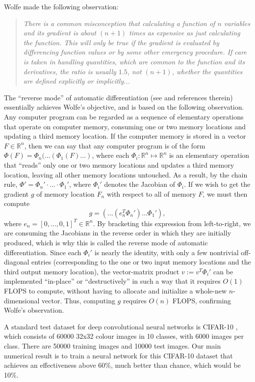 \documentclass[titlepage]{article}
\theoremstyle{plain}
\theoremstyle{definition}
\begin{document}
		
		Wolfe \cite{Wolfe} made the following observation: 
		\begin{quote}
			\textit{There is a common misconception that calculating a function of $n$ variables and its gradient is about $(n + 1)$ times as expensive as just calculating the function. This will only be true if the gradient is evaluated by differencing function values or by some other emergency procedure. If care is taken in handling quantities, which are common to the function and its derivatives, the ratio is usually $1.5$, not $(n + 1)$, whether the quantities are defined explicitly or implicitly...}
		\end{quote}
		The ``reverse mode'' of automatic differentiation (see \cite{Griewank} and references therein) essentially achieves Wolfe's objective, and is based on the following observation. Any computer program can be regarded as a sequence of elementary operations that operate on computer memory, consuming one or two memory locations and updating a third memory location. If the computer memory is stored in a vector $F \in \mathbb{R}^n$, then we can say that any computer program is of the form $\Phi(F) = \Phi_n(\ldots(\Phi_1(F)\ldots)$, where each $\Phi_i : \mathbb{R}^n \mapsto \mathbb{R}^n$ is an elementary operation that ``reads'' only one or two memory locations and updates a third memory location, leaving all other memory locations untouched. As a result, by the chain rule, $\Phi' = \Phi_n' \cdot \ldots \cdot \Phi_1'$, where $\Phi_i'$ denotes the Jacobian of $\Phi_i$. If we wish to get the gradient $g$ of memory location $F_n$ with respect to all of memory $F$, we must then compute
		$$
		g = (\ldots(e_n^T
		\Phi_n') \ldots \Phi_1'),
		$$
		where $e_n = [0,\ldots,0,1]^T \in \mathbb{R}^n$. By bracketing this expression from left-to-right, we are consuming the Jacobians in the reverse order in which they are initially produced, which is why this is called the reverse mode of automatic differentiation. Since each $\Phi_i'$ is nearly the identity, with only a few nontrivial off-diagonal entries (corresponding to the one or two input memory locations and the third output memory location), the vector-matrix product $v := v^T\Phi_i'$ can be implemented ``in-place'' or ``destructively'' in such a way that it requires $O(1)$ FLOPS to compute, without having to allocate and initialize a whole-new $n$-dimensional vector. Thus, computing $g$ requires $O(n)$ FLOPS, confirming Wolfe's observation.
		
		A standard test dataset for deep convolutional neural networks is CIFAR-10 \cite{Krizhevsky}, which consists of 60000 32x32 colour images in 10 classes, with 6000 images per class. There are 50000 training images and 10000 test images. Our main numerical result is to train a neural network for this CIFAR-10 dataset that achieves an effectiveness above 60\%, much better than chance, which would be 10\%.
		
\end{document}
